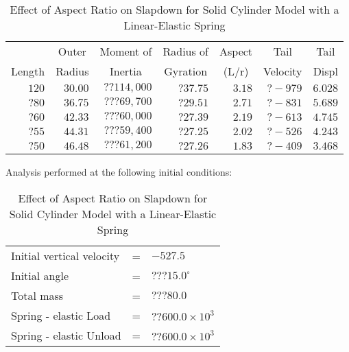\begin{table}
\begin{center}
\caption{Effect of Aspect Ratio on Slapdown for Solid Cylinder Model
with a Linear-Elastic Spring}
\makeqnum
\begin{tabular}{||r|r|r|r|r|r|r||}
\hline
&\multicolumn{1}{c|}{Outer}  
&\multicolumn{1}{c|}{Moment of} 
&\multicolumn{1}{c|}{Radius of} 
&\multicolumn{1}{c|}{Aspect} 
&\multicolumn{1}{c|}{Tail}
&\multicolumn{1}{c||}{Tail}\\
\multicolumn{1}{||c|}{Length} 
&\multicolumn{1}{c|}{Radius} 
&\multicolumn{1}{c|}{Inertia} 
&\multicolumn{1}{c|}{Gyration} 
&\multicolumn{1}{c|}{(L/r)}
&\multicolumn{1}{c|}{Velocity} 
&\multicolumn{1}{c||}{Displ}\\
\hline
 $120$ &$30.00$ &$??114,000$ &$?37.75$ &$3.18$ &$?-979$ &$6.028$\\
 $?80$ &$36.75$ &$???69,700$ &$?29.51$ &$2.71$ &$?-831$ &$5.689$\\
 $?60$ &$42.33$ &$???60,000$ &$?27.39$ &$2.19$ &$?-613$ &$4.745$\\
 $?55$ &$44.31$ &$???59,400$ &$?27.25$ &$2.02$ &$?-526$ &$4.243$\\
 $?50$ &$46.48$ &$???61,200$ &$?27.26$ &$1.83$ &$?-409$ &$3.468$\\
\hline
\end{tabular}
\end{center}

Analysis performed at the following initial conditions:

\makeqnum
\begin{tabular}{lll}
Initial vertical velocity &= &$-527.5$\\
Initial angle             &= &$???15.0^\circ$\\
Total mass                &= &$???80.0$\\
Spring - elastic     Load &= &$??600.0\times10^3$\\
Spring - elastic   Unload &= &$??600.0\times10^3$\\
\end{tabular}
\end{table}

